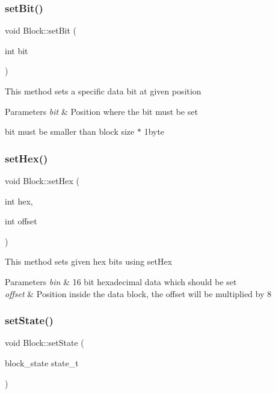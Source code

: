\subsubsection{\texorpdfstring{set\+Bit()}{setBit()}}
{\footnotesize\ttfamily void Block\+::set\+Bit (\begin{DoxyParamCaption}\item[{int}]{bit }\end{DoxyParamCaption})}

This method sets a specific data bit at given position


\begin{DoxyParams}{Parameters}
{\em bit} & Position where the bit must be set\\
\hline
\end{DoxyParams}
bit must be smaller than block size $\ast$ 1byte \mbox{\label{classlogic_1_1_block_ab7c61557660651b8afb417ac6fff8418}} 
\subsubsection{\texorpdfstring{set\+Hex()}{setHex()}}
{\footnotesize\ttfamily void Block\+::set\+Hex (\begin{DoxyParamCaption}\item[{int}]{hex,  }\item[{int}]{offset }\end{DoxyParamCaption})}

This method sets given hex bits using set\+Hex


\begin{DoxyParams}{Parameters}
{\em bin} & 16 bit hexadecimal data which should be set\\
\hline
{\em offset} & Position inside the data block, the offset will be multiplied by 8 \\
\hline
\end{DoxyParams}
\mbox{\label{classlogic_1_1_block_a2568d052f60f1c8fb59cc099bb8ba12b}} 
\subsubsection{\texorpdfstring{set\+State()}{setState()}}
{\footnotesize\ttfamily void Block\+::set\+State (\begin{DoxyParamCaption}\item[{block\+\_\+state}]{state\+\_\+t }\end{DoxyParamCaption})}

